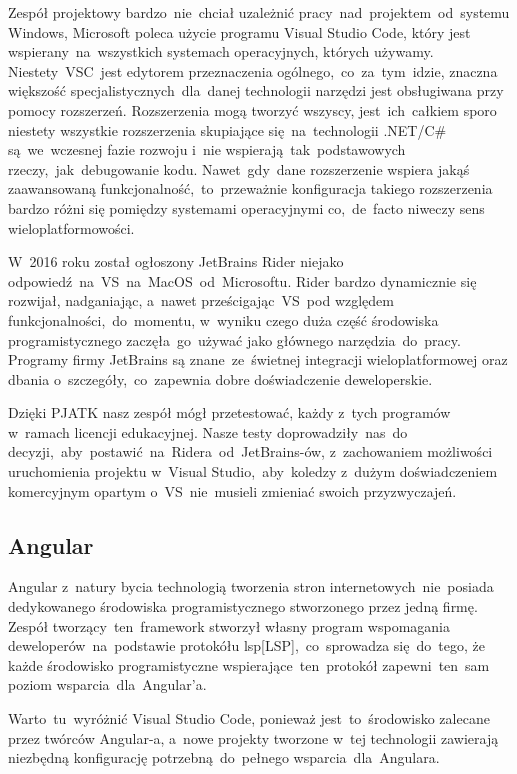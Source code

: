 Zespół projektowy bardzo~nie~chciał uzależnić pracy~nad~projektem~od~systemu Windows, Microsoft poleca użycie programu Visual Studio Code, który jest wspierany~na~wszystkich systemach operacyjnych, których używamy.
Niestety~VSC~jest edytorem przeznaczenia ogólnego,~co~za~tym~idzie, znaczna większość specjalistycznych~dla~danej technologii narzędzi jest obsługiwana przy pomocy rozszerzeń.
Rozszerzenia mogą tworzyć wszyscy, jest~ich~całkiem sporo niestety wszystkie rozszerzenia skupiające się~na~technologii .NET/C\# są~we~wczesnej fazie rozwoju i~nie wspierają~tak~podstawowych rzeczy,~jak~debugowanie kodu.
Nawet~gdy~dane rozszerzenie wspiera jakąś zaawansowaną funkcjonalność,~to~przeważnie konfiguracja takiego rozszerzenia bardzo różni się pomiędzy systemami operacyjnymi co,~de~facto niweczy sens wieloplatformowości.

W~2016 roku został ogłoszony JetBrains Rider niejako odpowiedź~na~VS~na~MacOS~od~Microsoftu.
Rider bardzo dynamicznie się rozwijał, nadganiając, a~nawet prześcigając~VS~pod względem funkcjonalności,~do~momentu, w~wyniku czego duża część środowiska programistycznego zaczęła~go~używać jako głównego narzędzia~do~pracy.
Programy firmy JetBrains są znane~ze~świetnej integracji wieloplatformowej oraz dbania o~szczegóły,~co~zapewnia dobre doświadczenie deweloperskie.

Dzięki PJATK nasz zespół mógł przetestować, każdy z~tych programów w~ramach licencji edukacyjnej.
Nasze testy doprowadziły~nas~do decyzji,~aby~postawić~na~Ridera~od~JetBrains-ów, z~zachowaniem możliwości uruchomienia projektu w~Visual Studio,~aby~koledzy z~dużym doświadczeniem komercyjnym opartym o~VS~nie~musieli zmieniać swoich przyzwyczajeń.

\subsection{Angular}\label{subsec:angular}
Angular z~natury bycia technologią tworzenia stron internetowych~nie~posiada dedykowanego środowiska programistycznego stworzonego przez jedną firmę.
Zespół tworzący~ten~framework stworzył własny program wspomagania deweloperów~na~podstawie protokółu \acrshort{lsp}[LSP],~co~sprowadza się~do~tego, że każde środowisko programistyczne wspierające~ten~protokół zapewni~ten~sam poziom wsparcia~dla~Angular'a.

Warto~tu~wyróżnić Visual Studio Code, ponieważ jest~to~środowisko zalecane przez twórców Angular-a, a~nowe projekty tworzone w~tej technologii zawierają niezbędną konfigurację potrzebną~do~pełnego wsparcia~dla~Angulara.

